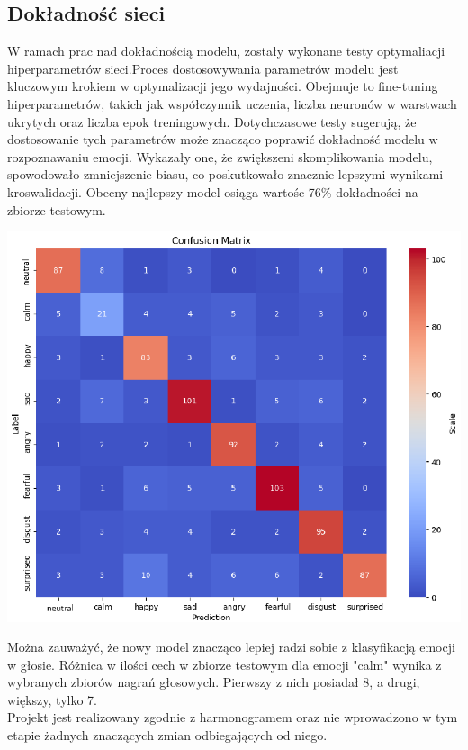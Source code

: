 \documentclass[12pt,titlepage]{article}
\begin{document}
\subsection{Dokładność sieci}
W ramach prac nad dokładnością modelu, zostały wykonane testy optymaliacji hiperparametrów sieci.Proces dostosowywania parametrów modelu jest kluczowym krokiem w optymalizacji jego wydajności. Obejmuje to fine-tuning hiperparametrów, takich jak współczynnik uczenia, liczba neuronów w warstwach ukrytych oraz liczba epok treningowych. Dotychczasowe testy sugerują, że dostosowanie tych parametrów może znacząco poprawić dokładność modelu w rozpoznawaniu emocji. Wykazały one, że zwiększeni skomplikowania modelu, spowodowało zmniejszenie biasu, co poskutkowało znacznie lepszymi wynikami kroswalidacji. Obecny najlepszy model osiąga wartośc 76\% dokładności na zbiorze testowym.
\begin{center}
    \includegraphics[width=\textwidth]{img/conf_matrix.png}
\end{center}
Można zauważyć, że nowy model znacząco lepiej radzi sobie z klasyfikacją emocji w głosie. Różnica w ilości cech w zbiorze testowym dla emocji "calm" wynika z wybranych zbiorów nagrań głosowych. Pierwszy z nich posiadał 8, a drugi, większy, tylko 7.\\
Projekt jest realizowany zgodnie z harmonogramem oraz nie wprowadzono w tym etapie żadnych znaczących zmian odbiegających od niego.
\end{document}
